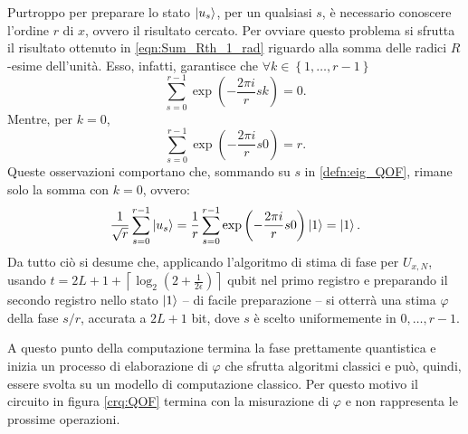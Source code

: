 Purtroppo per preparare lo stato $\ket{u_s}$, per un qualsiasi $s$, è necessario conoscere l'ordine $r$ di $x$, ovvero il risultato cercato.
Per ovviare questo problema si sfrutta il risultato ottenuto in \eqref{eqn:Sum_Rth_1_rad} riguardo alla somma delle radici $R$-esime dell'unità.
Esso, infatti, garantisce che $\forall k \in \left\{1, \dots, r-1 \right\}$
\begin{equation}
 \sum_{s=0}^{r-1} \exp\left(-\frac{2 \pi i}{r} sk\right) = 0.
\end{equation}
Mentre, per $k = 0$,
\begin{equation}
 \sum_{s=0}^{r-1} \exp\left(-\frac{2 \pi i}{r} s0\right) = r.
\end{equation}
Queste osservazioni comportano che, sommando su $s$ in \eqref{defn:eig_QOF}, rimane solo la somma con $k=0$, ovvero:
\begin{equation}
 \frac{1}{\sqrt{r}}\sum_{s=0}^{r-1} \ket{u_s} = \frac{1}{r}\sum_{s=0}^{r-1} \exp\left(-\frac{2 \pi i }{r} s0 \right)\ket{1} = \ket{1}.
\end{equation}
Da tutto ciò si desume che, applicando l'algoritmo di stima di fase per $U_{x,N}$, usando $t = 2L + 1 + \left\lceil \log_2\left(2 + \frac{1}{2\epsilon}\right)\right\rceil$ qubit nel primo registro e preparando il secondo registro nello stato $\ket{1}$ -- di facile preparazione -- si otterrà una stima $\varphi$ della fase  $s/r$, accurata a $2L+1$ bit, dove $s$ è scelto uniformemente in $0, \dots, r-1$.

A questo punto della computazione termina la fase prettamente quantistica e inizia un processo di elaborazione di $\varphi$ che sfrutta algoritmi classici e può, quindi, essere svolta su un modello di computazione classico.
Per questo motivo il circuito in figura \ref{crq:QOF} termina con la misurazione di $\varphi$ e non rappresenta le prossime operazioni.

